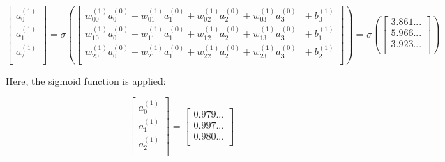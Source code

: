\documentclass[12pt,a4paper]{article}
\begin{document}
\begin{equation}
\left[\begin{matrix}a_0^{\left(1\right)}\\a_1^{\left(1\right)}\\a_2^{\left(1\right)}\\\end{matrix}\right]=\sigma\left(\left[\begin{matrix}w_{00}^{\left(1\right)}a_0^{\left(0\right)}+w_{01}^{\left(1\right)}a_1^{\left(0\right)}+w_{02}^{\left(1\right)}a_2^{\left(0\right)}+w_{03}^{\left(1\right)}a_3^{\left(0\right)}\\w_{10}^{\left(1\right)}a_0^{\left(0\right)}+w_{11}^{\left(1\right)}a_1^{\left(0\right)}+w_{12}^{\left(1\right)}a_2^{\left(0\right)}+w_{13}^{\left(1\right)}a_3^{\left(0\right)}\\w_{20}^{\left(1\right)}a_0^{\left(0\right)}+w_{21}^{\left(1\right)}a_1^{\left(0\right)}+w_{22}^{\left(1\right)}a_2^{\left(0\right)}+w_{23}^{\left(1\right)}a_3^{\left(0\right)}\\\end{matrix}\begin{matrix}{+\ b}_0^{\left(1\right)}\\+\ b_1^{\left(1\right)}\\+\
b_2^{\left(1\right)}\\\end{matrix}\right]\right)=\sigma\left(\left[\begin{matrix}3.861...\\5.966...\\3.923...\\\end{matrix}\right]\right)
\end{equation}

Here, the sigmoid function is applied:

\begin{equation}
\left[\begin{matrix}a_0^{\left(1\right)}\\a_1^{\left(1\right)}\\a_2^{\left(1\right)}\\\end{matrix}\right]=\left[\begin{matrix}0.979...\\0.997...\\0.980...\\\end{matrix}\right]
\end{equation}
\end{document}
